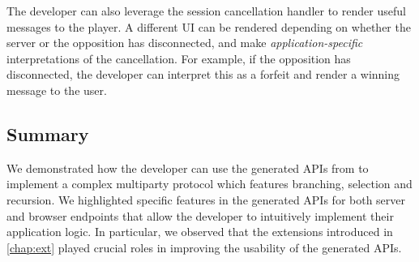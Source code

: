 The developer can also leverage the session cancellation handler
to render useful messages to the player.
A different UI can be rendered depending on whether
the server or the opposition has disconnected,
and make \textit{application-specific} interpretations of the cancellation.
For example, if the opposition has disconnected,
the developer can interpret this as a forfeit and
render a winning message to the user.

\subsection{Summary}
We demonstrated how the developer can use the generated APIs
from \codegen to implement a complex multiparty protocol
which features branching, selection and recursion.
We highlighted specific features in the generated APIs for both
server and browser endpoints that allow the developer
to intuitively implement their application logic.
In particular, we observed that the extensions introduced
in \cref{chap:ext} played crucial roles in
improving the usability of the generated APIs.